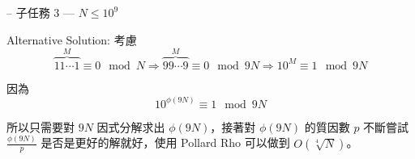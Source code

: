 \documentclass[hyperref,UTF8,notheorems,xcolor={dvipsnames}]{beamer}
\newcommand{\btitle}[1]{{\secname} -- #1}
\theoremstyle{definition}
\begin{document}
\begin{frame}[fragile]{\btitle{子任務 3 --- $N \leq 10^9$}}
	
	Alternative Solution: 考慮
	\[ \overset{M}{\overbrace{11\cdots1}} \equiv 0 \mod N \Rightarrow \overset{M}{\overbrace{99\cdots9}} \equiv 0 \mod 9N \Rightarrow 10^M \equiv 1 \mod 9N \]

	因為 
	\[ 10^{\phi(9N)} \equiv 1 \mod 9N \]

	所以只需要對 $9N$ 因式分解求出 $\phi(9N)$，接著對 $\phi(9N)$ 的質因數 $p$ 不斷嘗試 $\frac{\phi(9N)}{p}$ 是否是更好的解就好，使用 Pollard Rho 可以做到 $O(\sqrt[4]N)$。  
	
\end{frame}
\end{document}
